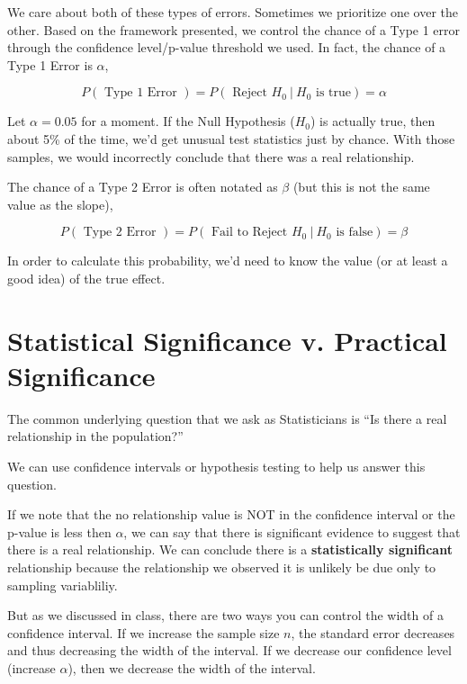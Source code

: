 \documentclass[]{book}
\begin{document}
We care about both of these types of errors. Sometimes we prioritize one over the other. Based on the framework presented, we control the chance of a Type 1 error through the confidence level/p-value threshold we used. In fact, the chance of a Type 1 Error is \(\alpha\),

\[P(\text{ Type 1 Error }) = P(\text{ Reject }H_0 ~|~H_0\text{ is true} ) =  \alpha\]

Let \(\alpha = 0.05\) for a moment. If the Null Hypothesis (\(H_0\)) is actually true, then about 5\% of the time, we'd get unusual test statistics just by chance. With those samples, we would incorrectly conclude that there was a real relationship.

The chance of a Type 2 Error is often notated as \(\beta\) (but this is not the same value as the slope),

\[P(\text{ Type 2 Error }) = P(\text{ Fail to Reject }H_0 ~|~H_0\text{ is false} ) =  \beta\]

In order to calculate this probability, we'd need to know the value (or at least a good idea) of the true effect.

\hypertarget{statistical-significance-v.-practical-significance}{%
\section{Statistical Significance v. Practical Significance}\label{statistical-significance-v.-practical-significance}}

The common underlying question that we ask as Statisticians is ``Is there a real relationship in the population?''

We can use confidence intervals or hypothesis testing to help us answer this question.

If we note that the no relationship value is NOT in the confidence interval or the p-value is less then \(\alpha\), we can say that there is significant evidence to suggest that there is a real relationship. We can conclude there is a \textbf{statistically significant} relationship because the relationship we observed it is unlikely be due only to sampling variabliliy.

But as we discussed in class, there are two ways you can control the width of a confidence interval. If we increase the sample size \(n\), the standard error decreases and thus decreasing the width of the interval. If we decrease our confidence level (increase \(\alpha\)), then we decrease the width of the interval.
\end{document}
